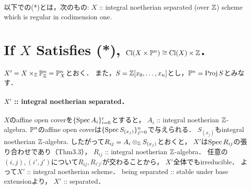 \documentclass[a4paper]{jsarticle}
\newcommand{\Cl}{\operatorname{Cl}}
\begin{document}
    以下での(*)とは，次のもの:
    $X$ :: integral noetherian separated (over $\mathbb{Z}$) scheme which is regular in codimension one.

\section{If $X$ Satisfies (*), $\Cl(X \times \proj^n) \cong \Cl(X) \times \Z$.} %
    $X'=X \times_{\mathbb{Z}} \mathbb{P}^n_{\mathbb{Z}}=\mathbb{P}_X^n$とおく．
    また，$S=\mathbb{Z}[x_0,\dots,x_n]$とし，$\mathbb{P}^n=\operatorname{Proj} S$とみなす．

    \paragraph{$X'$ :: integral noetherian separated．}
    $X$のaffine open coverを$\{\operatorname{Spec} A_i\}_{i=0}^r$とすると，
    $A_i$ :: integral noetherian $\mathbb{Z}$-algebra.
    $\mathbb{P}^n$のaffine open coverは$\{\operatorname{Spec} S_{(x_j)}\}_{j=0}^n$で与えられる．
    $S_{(x_j)}$もintegral noetherian $\mathbb{Z}$-algebra.
    したがって$R_{ij}=A_i \otimes_{\mathbb{Z}} S_{(x_j)}$とおくと，
    $X'$は$\operatorname{Spec} R_{ij}$の張り合わせであり（Thm3.3），
    $R_{ij}$ :: integral noetherian $\mathbb{Z}$-algebra．
    任意の$(i,j), (i',j')$について$R_{ij}, R_{i'j'}$が交わることから，
    $X'$全体でもirreducible．
    よって$X'$ :: integral noetherian scheme．
    being separated :: stable under base extensionより，
    $X'$ :: separated．
\end{document}
